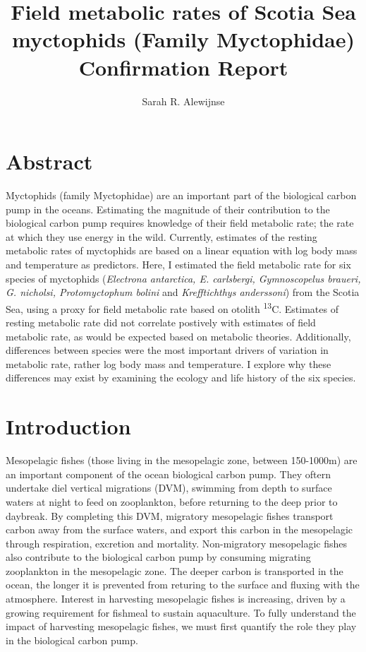\documentclass[12pt, titlepage]{article}
\title{Field metabolic rates of Scotia Sea myctophids (Family Myctophidae)\\
\large{Confirmation Report}}
\author{Sarah R. Alewijnse}
\begin{document}
\maketitle
\tableofcontents
\pagebreak

\section{Abstract}

Myctophids (family Myctophidae) are an important part of the biological carbon pump in the oceans.
Estimating the magnitude of their contribution to the biological carbon pump requires knowledge of their field metabolic rate; the rate at which they use energy in the wild.
Currently, estimates of the resting metabolic rates of myctophids are based on a linear equation with log body mass and temperature as predictors.
Here, I estimated the field metabolic rate for six species of myctophids (\textit{Electrona antarctica, E. carlsbergi, Gymnoscopelus braueri, G. nicholsi, Protomyctophum bolini} and \textit{Krefftichthys anderssoni}) from the Scotia Sea, using a proxy for field metabolic rate based on otolith \textdelta \textsuperscript{13}C.
Estimates of resting metabolic rate did not correlate postively with estimates of field metabolic rate, as would be expected based on metabolic theories.
Additionally, differences between species were the most important drivers of variation in metabolic rate, rather log body mass and temperature.
I explore why these differences may exist by examining the ecology and life history of the six species.

\pagebreak
\section{Introduction}

Mesopelagic fishes (those living in the mesopelagic zone, between 150-1000m) are an important component of the ocean biological carbon pump. %
They oftern undertake diel vertical migrations (DVM), swimming from depth to surface waters at night to feed on zooplankton, before returning to the deep prior to daybreak.
By completing this DVM, migratory mesopelagic fishes transport carbon away from the surface waters, and export this carbon in the mesopelagic through respiration, excretion and mortality. 
Non-migratory mesopelagic fishes also contribute to the biological carbon pump by consuming migrating zooplankton in the mesopelagic zone. %
The deeper carbon is transported in the ocean, the longer it is prevented from returing to the surface and fluxing with the atmosphere. %
Interest in harvesting mesopelagic fishes is increasing, driven by a growing requirement for fishmeal to sustain aquaculture. %
To fully understand the impact of harvesting mesopelagic fishes, we must first quantify the role they play in the biological carbon pump.
\end{document}
